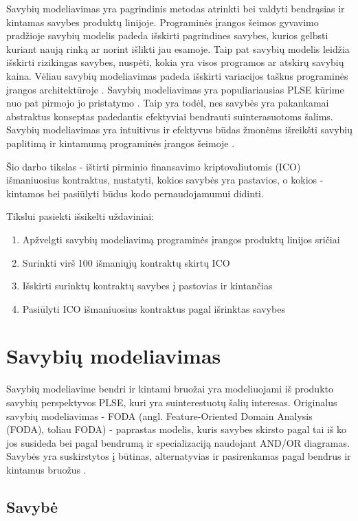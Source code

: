 \documentclass{VUMIFPSkursinis}
\begin{document}
Savybių modeliavimas yra pagrindinis metodas atrinkti bei valdyti bendrąsias ir kintamas savybes produktų linijoje. Programinės įrangos šeimos gyvavimo pradžioje savybių modelis padeda išskirti pagrindines savybes, kurios gelbsti kuriant naują rinką ar  norint išlikti jau esamoje. Taip pat savybių modelis leidžia išskirti rizikingas savybes, nuspėti, kokia yra visos programos ar atskirų savybių kaina. Vėliau savybių modeliavimas padeda išskirti variacijos taškus programinės įrangos architektūroje \cite{Czarnecki2004}. Savybių modeliavimas yra populiariausias PLSE kūrime nuo pat pirmojo jo pristatymo \cite{Kang1990}. Taip yra todėl, nes savybės yra pakankamai abstraktus konseptas padedantis efektyviai bendrauti suinterasuotoms šalims. Savybių modeliavimas yra intuitivus ir efektyvus būdas žmonėms išreikšti savybių paplitimą ir kintamumą programinės įrangos šeimoje \cite{Kang2013}. 

Šio darbo tikslas - ištirti pirminio finansavimo kriptovaliutomis (ICO) išmaniuosius kontraktus, nustatyti, kokios savybės yra pastavios, o kokios - kintamos bei pasiūlyti būdus kodo pernaudojamumui didinti. 

Tikslui pasiekti išsikelti uždaviniai:
\begin{enumerate}
\item Apžvelgti savybių modeliavimą programinės įrangos produktų linijos sričiai 
\item Surinkti virš 100 išmaniųjų kontraktų skirtų ICO
\item Išskirti surinktų kontraktų savybes į pastovias ir kintančias
\item Pasiūlyti ICO išmaniuosius kontraktus pagal išrinktas savybes
\end{enumerate}

\section{Savybių modeliavimas}
Savybių modeliavime bendri ir kintami bruožai yra modeliuojami iš produkto savybių perspektyvos PLSE, kuri yra suinterestuotų šalių interesas. Originalus savybių modeliavimas - FODA (angl. Feature-Oriented Domain Analysis (FODA), toliau FODA) \cite{Kang1990} - paprastas modelis, kuris savybes skirsto pagal tai iš ko jos susideda bei pagal bendrumą ir specializaciją naudojant AND/OR  diagramas. Savybės yra suskirstytos į būtinas, alternatyvias ir pasirenkamas pagal bendrus ir kintamus bruožus \cite{Kang2013}.

\subsection{Savybė} \label{savybe}
\end{document}
